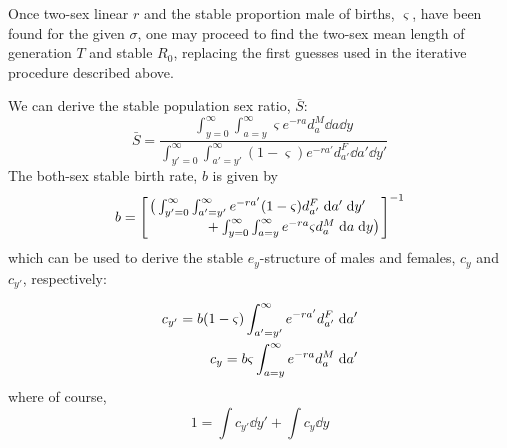  \FloatBarrier
\label{sec:2sexlinearother}
Once two-sex linear $r$ and the stable proportion male of births, $\varsigma$,
have been found for the given $\sigma$, one may proceed to find the 
two-sex mean length of generation $T$ and stable $R_0$,
replacing the first guesses used in the iterative procedure described above.

We can derive the stable population sex ratio, $\bar{S}$:
\begin{equation}
\bar{S} = \frac{ \int_{y=0}^\infty \int_{a=y}^\infty \varsigma e^{-ra} d_{a}^M
\dd a \dd y}{\int_{y'=0}^\infty \int_{a'=y'}^\infty (1-\varsigma) e^{-ra'}
d_{a'}^F \dd a' \dd y'}
\end{equation}
The both-sex stable birth rate, $b$ is given by
\begin{equation}
b = \Bigg[
            \splitfrac{\big( \int _{y'=0}^\infty
            \int _{a'=y'}^\infty e^{-r a'} (1-\varsigma) d_{a'}^F \dd a' \dd
            y'}{ + \int _{y=0}^\infty \int _{a=y}^\infty
             e^{-r a} \varsigma d_{a}^M \dd a \dd y\big)} \Bigg] ^{-1}          
\end{equation}
which can be used to derive the stable $e_y$-structure of males and females,
$c_y$ and $c_{y'}$, respectively:

\begin{align}
c_{y'} = b (1-\varsigma) \int _{a'=y'}^\infty
e^{-ra'} d_{a'}^F \; \mathrm{d} a' \notag \\
c_{y} = b \varsigma \int _{a=y}^\infty
e^{-ra} d_{a}^M \; \mathrm{d} a'
\label{eq:stablecy}
\end{align}
where of course,
\begin{equation}
1 = \int c_{y'} \dd y' + \int c_{y} \dd y
\end{equation}

